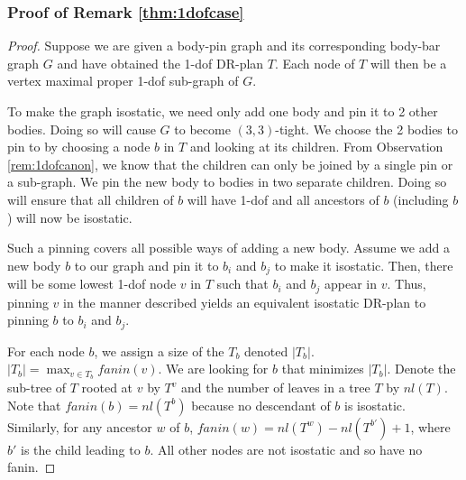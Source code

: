 \subsubsection{Proof of Remark \ref{thm:1dofcase}}
\begin{proof}
    Suppose we are given a body-pin graph and its corresponding body-bar graph $G$ and have obtained the 1-dof DR-plan $T$. Each node of $T$ will then be a vertex maximal proper 1-dof sub-graph of $G$.

    To make the graph isostatic, we need only add one body and pin it to 2 other bodies. Doing so will cause $G$ to become $(3,3)$-tight. We choose the 2 bodies to pin to by choosing a node $b$ in $T$ and looking at its children. From Observation \ref{rem:1dofcanon}, we know that the children can only be joined by a single pin or a sub-graph. We pin the new body to bodies in two separate children. Doing so will ensure that all children of $b$ will have 1-dof and all ancestors of $b$ (including $b$) will now be isostatic.


    Such a pinning covers all possible ways of adding a new body. Assume we add a new body $b$ to our graph and pin it to $b_i$ and $b_j$ to make it isostatic. Then, there will be some lowest 1-dof node $v$ in $T$ such that $b_i$ and $b_j$ appear in $v$. Thus, pinning $v$ in the manner described yields an equivalent isostatic DR-plan to pinning $b$ to $b_i$ and $b_j$.

    For each node $b$, we assign a size of the $T_b$ denoted $|T_b|$. $|T_b| = \displaystyle\max_{v \in T_b} fanin(v)$. We are looking for $b$ that minimizes $|T_b|$. Denote the sub-tree of $T$ rooted at $v$ by $T^v$ and the number of leaves in a tree $T$ by $nl(T)$. Note that $fanin(b)= nl(T^b)$ because no descendant of $b$ is isostatic. Similarly, for any ancestor $w$ of $b$, $fanin(w) = nl(T^w)-nl(T^{b'})+1$, where $b'$ is the child leading to $b$. All other nodes are not isostatic and so have no fanin.


\end{proof}
